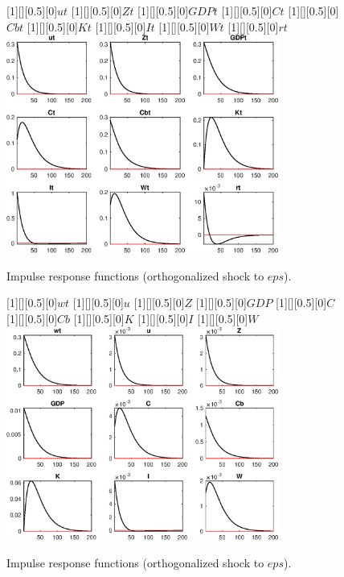  
\begin{figure}[H]
[1][][0.5][0]{$ut$}
[1][][0.5][0]{$Zt$}
[1][][0.5][0]{$GDPt$}
[1][][0.5][0]{$Ct$}
[1][][0.5][0]{$Cbt$}
[1][][0.5][0]{$Kt$}
[1][][0.5][0]{$It$}
[1][][0.5][0]{$Wt$}
[1][][0.5][0]{$rt$}
\centering 
\includegraphics[width=0.80\textwidth]{DyReiter/graphs/DyReiter_IRF_eps1}
\caption{Impulse response functions (orthogonalized shock to $eps$).}\label{Fig:IRF:eps:1}
\end{figure}
 
\begin{figure}[H]
[1][][0.5][0]{$wt$}
[1][][0.5][0]{$u$}
[1][][0.5][0]{$Z$}
[1][][0.5][0]{$GDP$}
[1][][0.5][0]{$C$}
[1][][0.5][0]{$Cb$}
[1][][0.5][0]{$K$}
[1][][0.5][0]{$I$}
[1][][0.5][0]{$W$}
\centering 
\includegraphics[width=0.80\textwidth]{DyReiter/graphs/DyReiter_IRF_eps2}
\caption{Impulse response functions (orthogonalized shock to $eps$).}\label{Fig:IRF:eps:2}
\end{figure}
 
